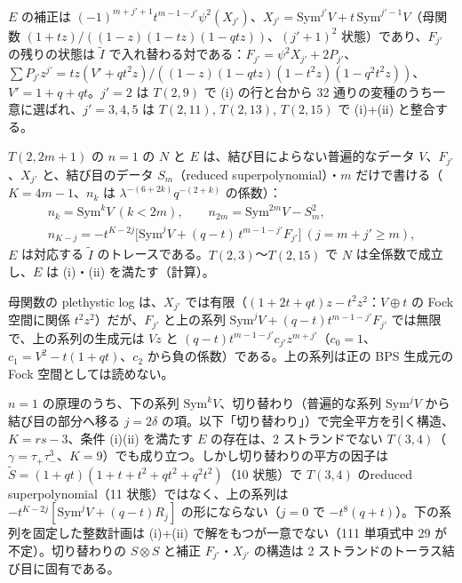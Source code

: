 \begin{conjecture}\label{conj:correctionI}
$E$ の補正は $(-1)^{m+j'+1}t^{m-1-j'}\psi^2(X_{j'})$、$X_{j'} = \mathrm{Sym}^{j'}V + t\,\mathrm{Sym}^{j'-1}V$（母関数 $(1+tz)/((1-z)(1-tz)(1-qtz))$、$(j'+1)^2$ 状態）であり、$F_{j'}$ の残りの状態は $\tilde I$ で入れ替わる対である：$F_{j'} = \psi^2 X_{j'} + 2P_{j'}$、$\sum P_{j'}z^{j'} = tz(V' + qt^2z)/((1-z)(1-qtz)(1-t^2z)(1-q^2t^2z))$、$V' = 1 + q + qt$。$j' = 2$ は $T(2,9)$ で (i) の行と台から 32 通りの変種のうち一意に選ばれ、$j' = 3, 4, 5$ は $T(2,11)$, $T(2,13)$, $T(2,15)$ で (i)+(ii) と整合する。
\end{conjecture}
\begin{conjecture}[閉じた式]\label{conj:closedform}
$T(2,2m+1)$ の $n = 1$ の $N$ と $E$ は、結び目によらない普遍的なデータ $V$、$F_{j'}$、$X_{j'}$ と、結び目のデータ $S_m$（reduced superpolynomial）・$m$ だけで書ける（$K = 4m-1$、$n_k$ は $\lambda^{-(6+2k)}q^{-(2+k)}$ の係数）：
\begin{gather*}
 n_k = \mathrm{Sym}^kV\ (k<2m),\qquad n_{2m} = \mathrm{Sym}^{2m}V - S_m^2,\\
 n_{K-j} = -t^{K-2j}\bigl[\mathrm{Sym}^jV + (q-t)\,t^{m-1-j'}F_{j'}\bigr]\ (j = m+j' \ge m),
\end{gather*}
$E$ は対応する $\tilde I$ のトレースである。$T(2,3)$〜$T(2,15)$ で $N$ は全係数で成立し、$E$ は (i)・(ii) を満たす（計算）。
\end{conjecture}
\begin{compresult}\label{cr:plog}
母関数の plethystic log は、$X_{j'}$ では有限（$(1+2t+qt)z - t^2z^2$：$V\oplus t$ の Fock 空間に関係 $t^2z^2$）だが、$F_{j'}$ と上の系列 $\mathrm{Sym}^jV + (q-t)t^{m-1-j'}F_{j'}$ では無限で、上の系列の生成元は $Vz$ と $(q-t)t^{m-1-j'}c_{j'}z^{m+j'}$（$c_0 = 1$、$c_1 = V^2 - t(1+qt)$、$c_2$ から負の係数）である。上の系列は正の BPS 生成元の Fock 空間としては読めない。
\end{compresult}
\begin{compresult}\label{cr:t34}
$n = 1$ の原理のうち、下の系列 $\mathrm{Sym}^kV$、切り替わり（普遍的な系列 $\mathrm{Sym}^jV$ から結び目の部分へ移る $j = 2\delta$ の項。以下「切り替わり」）で完全平方を引く構造、$K = rs - 3$、条件 (i)(ii) を満たす $E$ の存在は、2 ストランドでない $T(3,4)$（$\gamma = \tau_+\tau_-^3$、$K = 9$）でも成り立つ。しかし切り替わりの平方の因子は $\tilde S = (1+qt)(1+t+t^2+qt^2+q^2t^2)$（10 状態）で $T(3,4)$ のreduced superpolynomial（11 状態）ではなく、上の系列は $-t^{K-2j}[\mathrm{Sym}^jV + (q-t)R_j]$ の形にならない（$j = 0$ で $-t^8(q+t)$）。下の系列を固定した整数計画は (i)+(ii) で解をもつが一意でない（111 単項式中 29 が不定）。切り替わりの $S\otimes S$ と補正 $F_{j'}$・$X_{j'}$ の構造は 2 ストランドのトーラス結び目に固有である。
\end{compresult}
